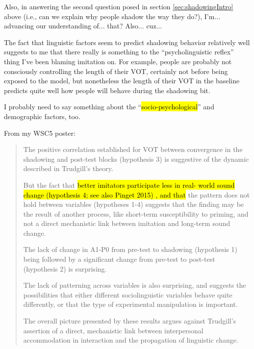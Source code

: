     Also, in answering the second question posed in section \ref{sec:shadowingIntro} above (i.e., can we explain why people shadow the way they do?), I'm... advancing our understanding of... that? Also... cuz...

    The fact that linguistic factors seem to predict shadowing behavior relatively well %
    suggests to me that there really is something to the ``psycholinguistic reflex'' thing I've been blaming imitation on. %
    For example, people are probably not consciously controlling the length of their VOT, certainly not before being exposed to the model, but nonetheless the length of their VOT in the baseline predicts quite well how people will behave during the shadowing bit.

    I probably need to say something about the ``\hl{socio-psychological}'' and demographic factors, too. 
    
    From my WSC5 poster:
    \begin{quote}
    The positive correlation established for VOT between convergence in the shadowing and post-test blocks%
    (hypothesis 3) is suggestive of the dynamic described in Trudgill’s theory.
    
    But the fact that \hl{better imitators participate less in real- world sound change (hypothesis 4; see also Pinget 2015)%
    , and that} the pattern does not hold between variables (hypotheses 1-4) %
    suggests that the finding may be the result of another process, like short-term susceptibility to priming, and not a direct mechanistic link between imitation and long-term sound change.
    
    The lack of change in A1-P0 from pre-test to shadowing (hypothesis 1) being followed by a significant change from pre-test to post-test (hypothesis 2) is surprising.
    
    The lack of patterning across variables is also surprising, and suggests the possibilities that either different sociolinguistic variables behave quite differently, or that the type of experimental manipulation is important.
    
    The overall picture presented by these results argues against Trudgill’s assertion of a direct, mechanistic link between interpersonal accommodation in interaction and the propagation of linguistic change.
    \end{quote}

